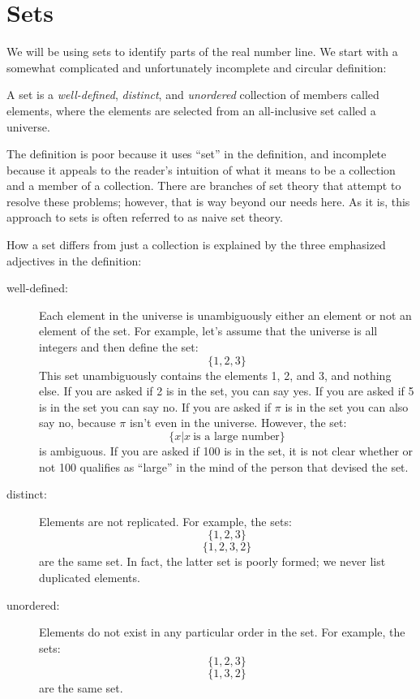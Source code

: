 \documentclass[letterpaper,12pt,fleqn]{article}
\begin{document}
\section*{Sets}

We will be using sets to identify parts of the real number line. We start with a
somewhat complicated and unfortunately incomplete and circular definition:

\begin{definition}[Set]
A set is a \emph{well-defined}, \emph{distinct}, and \emph{unordered}
collection of members called elements, where the elements are selected from
an all-inclusive set called a universe.
\end{definition}

The definition is poor because it uses ``set'' in the definition, and
incomplete because it appeals to the reader's intuition of what it means to be
a collection and a member of a collection. There are branches of set theory
that attempt to resolve these problems; however, that is way beyond our needs
here. As it is, this approach to sets is often referred to as naive set theory.

How a set differs from just a collection is explained by the three emphasized
adjectives in the definition:

\begin{description}
\item[well-defined:] Each element in the universe is unambiguously either an
element or not an element of the set. For example, let's assume that the
universe is all integers and then define the set:
\[\{1, 2, 3\}\]
This set unambiguously contains the elements 1, 2, and 3, and nothing else. If
you are asked if 2 is in the set, you can say yes. If you are asked if 5 is in
the set you can say no. If you are asked if $\pi$ is in the set you can also
say no, because $\pi$ isn't even in the universe. However, the set:
\[\{x|x\ \mbox{is a large number}\}\]
is ambiguous. If you are asked if 100 is in the set, it is not clear whether or
not 100 qualifies as ``large'' in the mind of the person that devised the set.

\item[distinct:] Elements are not replicated. For example, the sets:
\[\{1, 2, 3\}\]
\[\{1, 2, 3, 2\}\]
are the same set. In fact, the latter set is poorly formed; we never list
duplicated elements.

\item[unordered:] Elements do not exist in any particular order in the set.
For example, the sets:
\[\{1, 2, 3\}\]
\[\{1, 3, 2\}\]
are the same set.
\end{description}
\end{document}
